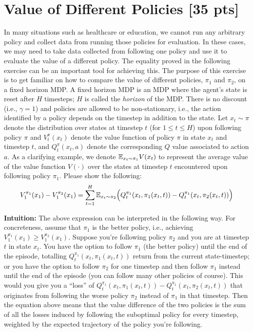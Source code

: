 \section{Value of Different Policies [35 pts]}
In many situations such as healthcare or education, we cannot run any arbitrary policy and collect data from running those policies for evaluation. In these cases, we may need to take data collected from following one policy and use it to evaluate the value of a different policy. The equality proved in the following exercise can be an important tool for achieving this.
The purpose of this exercise is to get familiar on how to compare the value of different policies, $\pi_1$ and $\pi_2$, on a fixed horizon MDP. A fixed horizon MDP is an MDP where the agent's state is reset after $H$ timesteps; $H$ is called the \emph{horizon} of the MDP. There is no discount (i.e., $\gamma=1$) and policies are allowed to be non-stationary, i.e., the action identified by a policy depends on the timestep in addition to the state.
Let $x_t\sim \pi$ denote the distribution over states at timestep $t$ (for $1\leq t \leq H$) upon following policy $\pi$ and $V^{\pi}_t(x_t)$ denote the value function of policy $\pi$ in state 
$x_t$ and timestep $t$, and $Q_t^{\pi}(x_t,a)$ denote the corresponding 
$Q$ value associated to action $a$. As a clarifying example, we denote $\mathbb E_{x_t \sim \pi_1} V(x_t)$ to represent the average value of the value function $V(\cdot)$ over the states at timestep $t$ encountered upon following policy $\pi_1$. Please show the following:
\begin{equation}
\label{eq:1}
V_1^{\pi_1}(x_1) - V_1^{\pi_2}(x_1) =  \sum_{t=1}^H \mathbb E_{x_t \sim \pi_2} \Big( Q_t^{\pi_1}(x_t,\pi_1(x_t,t)) - Q_t^{\pi_1}(x_t,\pi_2(x_t,t)) \Big)
\end{equation}

\textbf{Intuition:} The above expression can be interpreted in the following way. For concreteness, assume that $\pi_1$ is the better policy, i.e., achieving $V_1^{\pi_1}(x_1) \geq V_1^{\pi_2}(x_1)$. Suppose you're following policy $\pi_2$ and you are at timestep $t$ in state $x_t$. 
You have the option to follow $\pi_1$ (the better policy) until the end of the episode, totalling $Q_t^{\pi_1}(x_t,\pi_1(x_t,t))$ return from the current state-timestep; or you have the option to follow $\pi_2$ for one timestep and then follow $\pi_1$ instead until the end of the episode (you can follow many other policies of course). This would you give you a ``loss'' of $Q_t^{\pi_1}(x_t,\pi_1(x_t,t)) - Q_t^{\pi_1}(x_t,\pi_2(x_t,t))$ that originates from following the worse policy $\pi_2$ instead of $\pi_1$ in that timestep. 
Then the equation above
means that the value difference of the two policies is the sum of all the losses induced by following the suboptimal policy for every timestep, weighted by the expected trajectory of the policy you're following.